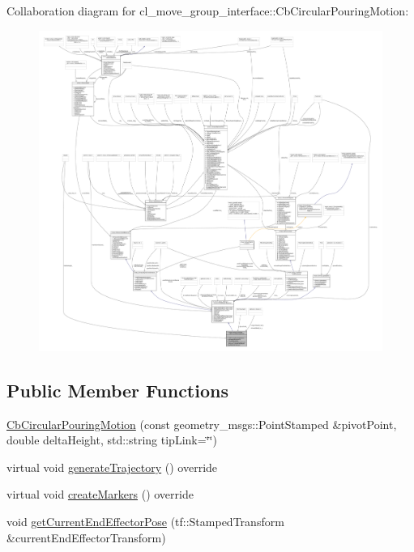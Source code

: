 Collaboration diagram for cl\+\_\+move\+\_\+group\+\_\+interface\+:\+:Cb\+Circular\+Pouring\+Motion\+:
\nopagebreak
\begin{figure}[H]
\begin{center}
\leavevmode
\includegraphics[width=350pt]{classcl__move__group__interface_1_1CbCircularPouringMotion__coll__graph}
\end{center}
\end{figure}
\subsection*{Public Member Functions}
\begin{DoxyCompactItemize}
\item 
\hyperlink{classcl__move__group__interface_1_1CbCircularPouringMotion_a774a9d74ca112002c89a375f06166257}{Cb\+Circular\+Pouring\+Motion} (const geometry\+\_\+msgs\+::\+Point\+Stamped \&pivot\+Point, double delta\+Height, std\+::string tip\+Link=\char`\"{}\char`\"{})
\item 
virtual void \hyperlink{classcl__move__group__interface_1_1CbCircularPouringMotion_a9150bb3731082aad3af2d7d6e067a344}{generate\+Trajectory} () override
\item 
virtual void \hyperlink{classcl__move__group__interface_1_1CbCircularPouringMotion_a26d603b1d9bdbf5b71da6c1c4af2c322}{create\+Markers} () override
\item 
void \hyperlink{classcl__move__group__interface_1_1CbCircularPouringMotion_a0cc72cc5233ecb0c264621d4d9501b30}{get\+Current\+End\+Effector\+Pose} (tf\+::\+Stamped\+Transform \&current\+End\+Effector\+Transform)
\end{DoxyCompactItemize}
